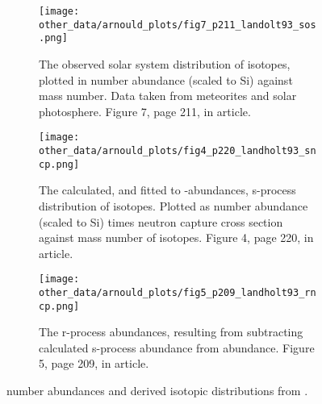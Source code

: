 \setlength{\subfiglength}{0.3\textwidth}
\begin{figure}
  \begin{subfigure}{\subfiglength}
    \centering
    \texttt{[image: other\_data/arnould\_plots/fig7\_p211\_landolt93\_sos.png]}
    \caption{The observed solar system distribution of isotopes, plotted in number abundance (scaled to Si) against mass number. Data taken from meteorites and solar photosphere.
    Figure 7, page 211, in article.}
  \end{subfigure}
  \begin{subfigure}{\subfiglength}
    \centering
    \texttt{[image: other\_data/arnould\_plots/fig4\_p220\_landholt93\_sncp.png]}            
    \caption{The calculated, and fitted to \sos-abundances, s-process distribution of isotopes. Plotted as number abundance (scaled to Si) times neutron capture cross section against mass number of isotopes.
    Figure 4, page 220, in article.}
  \end{subfigure}
  \begin{subfigure}{\subfiglength}
    \centering
    \texttt{[image: other\_data/arnould\_plots/fig5\_p209\_landholt93\_rncp.png]}
    \caption{The r-process abundances, resulting from subtracting calculated s-process abundance from \sos abundance.
    Figure 5, page 209, in article.}
  \end{subfigure}
  \caption{\label{fig:landholt-figures}
    \sos number abundances and derived isotopic distributions from \cite{landolt93}.
  }
\end{figure}

\FloatBarrier
